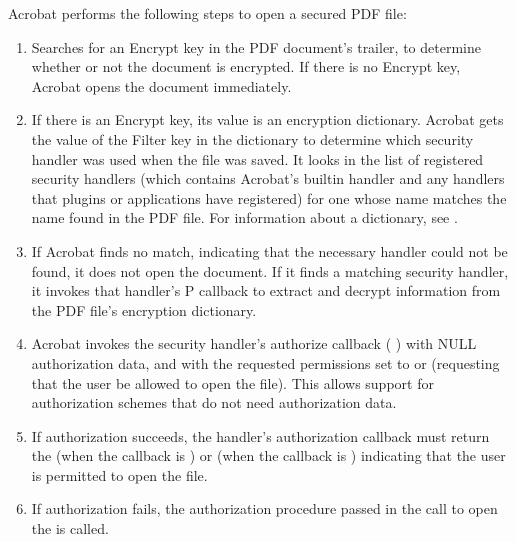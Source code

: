\documentclass[letterpaper,12pt,english,openany,oneside]{sphinxmanual}
\begin{document}
Acrobat performs the following steps to open a secured PDF file:
\begin{enumerate}
%
\item {} 
Searches for an Encrypt key in the PDF document’s trailer, to determine whether or not the document is encrypted. If there is no Encrypt key, Acrobat opens the document immediately.

\item {} 
If there is an Encrypt key, its value is an encryption dictionary. Acrobat gets the value of the Filter key in the dictionary to determine which security handler was used when the file was saved. It looks in the list of registered security handlers (which contains Acrobat’s built\sphinxhyphen{}in handler and any handlers that plugins or applications have registered) for one whose name matches the name found in the PDF file. For information about a dictionary, see .

\item {} 
If Acrobat finds no match, indicating that the necessary handler could not be found, it does not open the document. If it finds a matching security handler, it invokes that handler’s P  callback to extract and decrypt information from the PDF file’s encryption dictionary.

\item {} 
Acrobat invokes the security handler’s authorize callback ( ) with NULL authorization data, and with the requested permissions set to  or  (requesting that the user be allowed to open the file). This allows support for authorization schemes that do not need authorization data.

\item {} 
If authorization succeeds, the handler’s authorization callback must return the  (when the callback is  ) or  (when the callback is  ) indicating that the user is permitted to open the file.

\item {} 
If authorization fails, the authorization procedure passed in the call to open the  is called.


\end{enumerate}
\end{document}

